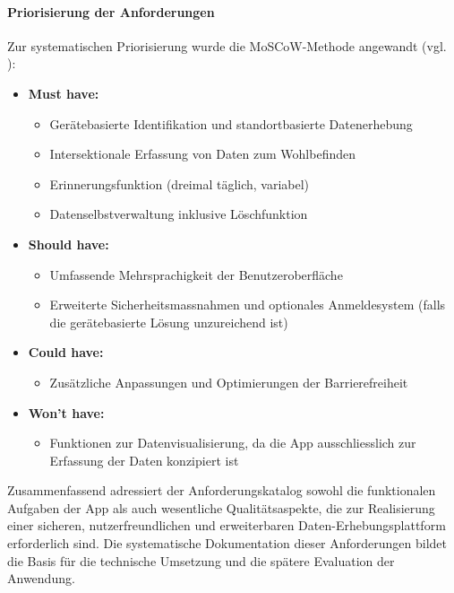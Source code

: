 \paragraph{Priorisierung der Anforderungen}  
Zur systematischen Priorisierung wurde die MoSCoW-Methode angewandt (vgl. \cite{clegg_case_1994}):
\begin{itemize}
    \item \textbf{Must have:}  
    \begin{itemize}
        \item Gerätebasierte Identifikation und standortbasierte Datenerhebung
        \item Intersektionale Erfassung von Daten zum Wohlbefinden
        \item Erinnerungsfunktion (dreimal täglich, variabel)
        \item Datenselbstverwaltung inklusive Löschfunktion
    \end{itemize}
    \item \textbf{Should have:}  
    \begin{itemize}
        \item Umfassende Mehrsprachigkeit der Benutzeroberfläche
        \item Erweiterte Sicherheitsmassnahmen und optionales Anmeldesystem (falls die gerätebasierte Lösung unzureichend ist)
    \end{itemize}
    \item \textbf{Could have:}  
    \begin{itemize}
        \item Zusätzliche Anpassungen und Optimierungen der Barrierefreiheit
    \end{itemize}
    \item \textbf{Won’t have:}  
    \begin{itemize}
        \item Funktionen zur Datenvisualisierung, da die App ausschliesslich zur Erfassung der Daten konzipiert ist
    \end{itemize}
\end{itemize}

Zusammenfassend adressiert der Anforderungskatalog sowohl die funktionalen Aufgaben der App als auch wesentliche Qualitätsaspekte, die zur Realisierung einer sicheren, nutzerfreundlichen und erweiterbaren Daten-Erhebungsplattform erforderlich sind. Die systematische Dokumentation dieser Anforderungen bildet die Basis für die technische Umsetzung und die spätere Evaluation der Anwendung.
